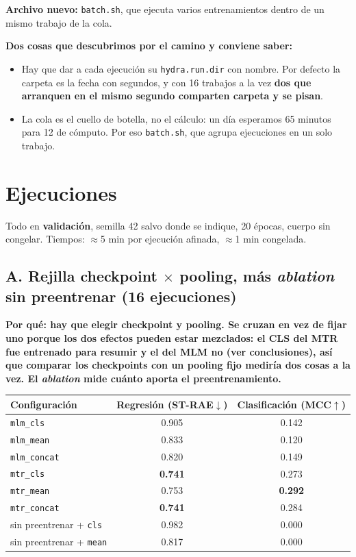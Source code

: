 \documentclass[11pt,a4paper]{article}
\newcommand{\var}[1]{\texttt{#1}}
\newcommand{\exper}[2]{\subsection*{#1}\noindent\textbf{\small\textcolor{dtured}{#2}}\par\smallskip}
\begin{document}
\noindent\textbf{Archivo nuevo:} \var{batch.sh}, que ejecuta varios entrenamientos dentro de un mismo
trabajo de la cola.

\begin{concl}
\textbf{Dos cosas que descubrimos por el camino y conviene saber:}
\begin{itemize}
  \item Hay que dar a cada ejecución su \var{hydra.run.dir} con nombre. Por defecto la carpeta es la
        fecha con segundos, y con 16 trabajos a la vez \textbf{dos que arranquen en el mismo segundo
        comparten carpeta y se pisan}.
  \item La cola es el cuello de botella, no el cálculo: un día esperamos 65 minutos para 12 de
        cómputo. Por eso \var{batch.sh}, que agrupa ejecuciones en un solo trabajo.
\end{itemize}
\end{concl}

\section{Ejecuciones}

Todo en \textbf{validación}, semilla 42 salvo donde se indique, 20 épocas, cuerpo sin congelar.
Tiempos: $\approx$5 min por ejecución afinada, $\approx$1 min congelada.

\exper{A. Rejilla checkpoint $\times$ pooling, más \emph{ablation} sin preentrenar (16 ejecuciones)}
{Por qué: hay que elegir checkpoint y pooling. Se cruzan en vez de fijar uno porque los dos efectos pueden estar mezclados: el CLS del MTR fue entrenado para resumir y el del MLM no (ver conclusiones), así que comparar los checkpoints con un pooling fijo mediría dos cosas a la vez. El \emph{ablation} mide cuánto aporta el preentrenamiento.}

\begin{center}
\begin{tabular}{lcc}
\toprule
Configuración & Regresión (ST-RAE$\downarrow$) & Clasificación (MCC$\uparrow$) \\ \midrule
\var{mlm\_cls}    & 0.905 & 0.142 \\
\var{mlm\_mean}   & 0.833 & 0.120 \\
\var{mlm\_concat} & 0.820 & 0.149 \\ \midrule
\var{mtr\_cls}    & \textbf{0.741} & 0.273 \\
\var{mtr\_mean}   & 0.753 & \textbf{0.292} \\
\var{mtr\_concat} & \textbf{0.741} & 0.284 \\ \midrule
sin preentrenar + \var{cls}  & 0.982 & 0.000 \\
sin preentrenar + \var{mean} & 0.817 & 0.000 \\
\bottomrule
\end{tabular}
\end{center}
\end{document}
